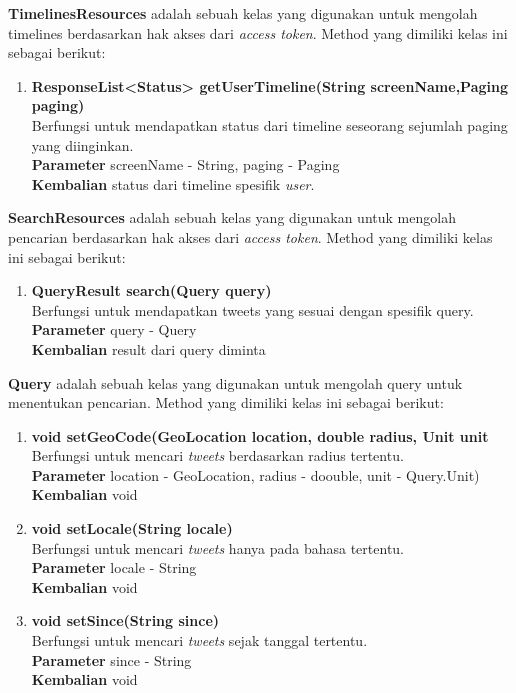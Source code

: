 \textbf{TimelinesResources} adalah sebuah kelas yang digunakan untuk mengolah timelines berdasarkan hak akses dari \textit{access token}. Method yang dimiliki kelas ini sebagai berikut:
\begin{enumerate}
	\item \textbf{ResponseList<Status> getUserTimeline(String screenName,Paging paging)}\\
	Berfungsi untuk mendapatkan status dari timeline seseorang sejumlah paging yang diinginkan.\\
	\textbf{Parameter} screenName - String, paging - Paging\\
	\textbf{Kembalian} status dari timeline spesifik \textit{user}.
\end{enumerate}
\textbf{SearchResources} adalah sebuah kelas yang digunakan untuk mengolah pencarian berdasarkan hak akses dari \textit{access token}. Method yang dimiliki kelas ini sebagai berikut:
\begin{enumerate}
	\item \textbf{QueryResult search(Query query)}\\
	Berfungsi untuk mendapatkan tweets yang sesuai dengan spesifik query.\\
	\textbf{Parameter} query - Query\\
	\textbf{Kembalian} result dari query diminta
\end{enumerate}
\textbf{Query} adalah sebuah kelas yang digunakan untuk mengolah query untuk menentukan pencarian. Method yang dimiliki kelas ini sebagai berikut:
\begin{enumerate}
	\item \textbf{void setGeoCode(GeoLocation location, double radius, Unit unit}\\
	Berfungsi untuk mencari \textit{tweets} berdasarkan radius tertentu.\\
	\textbf{Parameter} location - GeoLocation, radius - doouble, unit - Query.Unit)\\
	\textbf{Kembalian} void
	\item \textbf{void setLocale(String locale)}\\
	Berfungsi untuk mencari \textit{tweets} hanya pada bahasa tertentu.\\
	\textbf{Parameter} locale - String\\
	\textbf{Kembalian} void
	\item \textbf{void setSince(String since)}\\
	Berfungsi untuk mencari \textit{tweets} sejak tanggal tertentu.\\
	\textbf{Parameter} since - String\\
	\textbf{Kembalian} void
\end{enumerate}
